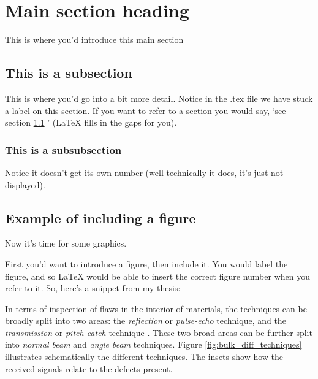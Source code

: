 	\section{Main section heading}

This is where you'd introduce this main section

		\subsection{This is a subsection}
		\label{sec:first_subsection}

This is where you'd go into a bit more detail. Notice in the .tex file
we have stuck a label on this section. If you want to refer to a section
you would say, `see section \ref{sec:first_subsection} ' (\LaTeX{} fills in
the gaps for you).

		\subsubsection{This is a subsubsection}

Notice it doesn't get its own number (well technically it does, it's
just not displayed).


		\subsection{Example of including a figure}

Now it's time for some graphics.

First you'd want to introduce a figure, then include it. You would label
the figure, and so \LaTeX{} would be able to insert the correct figure
number when you refer to it. So, here's a snippet from my thesis:

In terms of inspection of flaws in the interior of materials, the
techniques can be broadly split into two areas: the \emph{reflection} or
\emph{pulse-echo} technique, and the \emph{transmission} or
\emph{pitch-catch} technique \cite{bray_nde}. These two broad areas can be
further split into \emph{normal beam} and \emph{angle beam} techniques.  
Figure \ref{fig:bulk_diff_techniques} illustrates schematically the
different techniques. The insets show how the received signals relate to
the defects present.

